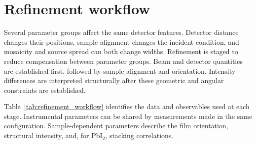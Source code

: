 \section{Refinement workflow}
\label{sec:refinement_workflow}

Several parameter groups affect the same detector features. Detector distance changes their positions, sample alignment changes the incident condition, and mosaicity and source spread can both change widths. Refinement is staged to reduce compensation between parameter groups. Beam and detector quantities are established first, followed by sample alignment and orientation. Intensity differences are interpreted structurally after these geometric and angular constraints are established.

Table~\ref{tab:refinement_workflow} identifies the data and observables used at each stage. Instrumental parameters can be shared by measurements made in the same configuration. Sample-dependent parameters describe the film orientation, structural intensity, and, for PbI$_2$, stacking correlations.

